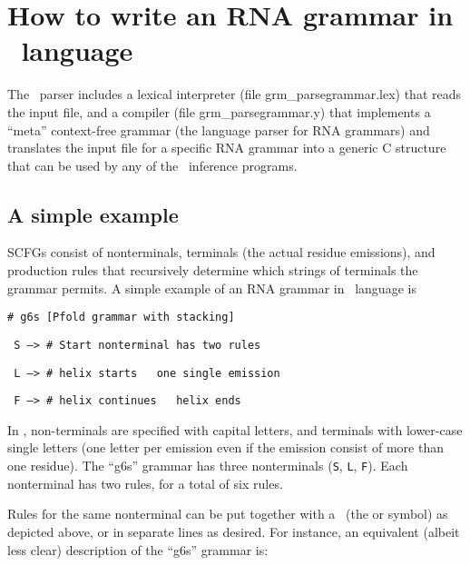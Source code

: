 \section{How to write an RNA grammar in \tornado\, language}

The \tornado\, parser includes a lexical interpreter (file
grm\_parsegrammar.lex) that reads the input file, and a compiler (file
grm\_parsegrammar.y) that implements a ``meta'' context-free grammar
(the language parser for RNA grammars) and translates the input file
for a specific RNA grammar into a generic C structure that can be used
by any of the \tornado\, inference programs.

\subsection{A simple example}

SCFGs consist of nonterminals, terminals (the actual residue
emissions), and production rules that recursively determine which
strings of terminals the grammar permits. A simple example of an RNA
grammar in \tornado\, language is \\

\noindent
\begin{footnotesize}
\texttt{\# g6s  [Pfold grammar with stacking]}

\texttt{  S -->  \# Start nonterminal has two rules}

\texttt{  L -->  \# helix starts \orr\, one single emission}

\texttt{  F -->  \# helix continues \orr\, helix ends}\\
\end{footnotesize}

\noindent
In \tornado, non-terminals are specified with capital letters, and
terminals with lower-case single letters (one letter per emission even
if the emission consist of more than one residue). The ``g6s''
grammar has three nonterminals (\texttt{S}, \texttt{L}, \texttt{F}).
Each nonterminal has two rules, for a total of six rules.

\noindent
Rules for the same nonterminal can be put together with a \orr\, (the
or symbol) as depicted above, or in separate lines as desired. For
instance, an equivalent (albeit less clear) description of the ``g6s''
grammar is:\\

